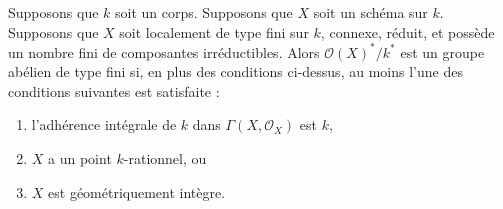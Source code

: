 \begin{proposition}
\label{proposition-units-general}
Supposons que $k$ soit un corps. Supposons que $X$ soit un schéma sur
$k$. Supposons que $X$ soit localement de type fini sur $k$, connexe,
réduit, et possède un nombre fini de composantes irréductibles. Alors
$\mathcal{O}(X)^*/k^*$ est un groupe abélien de type fini si, en plus des
conditions ci-dessus, au moins l'une des conditions suivantes est satisfaite :
\begin{enumerate}
\item l'adhérence intégrale de $k$ dans $\Gamma(X,
\mathcal{O}_X)$ est $k$, \item $X$ a un point
$k$-rationnel, ou \item $X$ est géométriquement intègre.
\end{enumerate}
\end{proposition}

